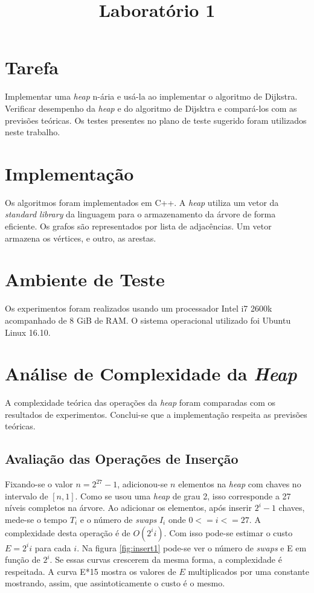 \documentclass{iiufrgs}
\title{Laboratório 1}
\author{}{Thiago Bell}
\begin{document}
\maketitle

\setcounter{chapter}{1}

\section{Tarefa}
Implementar uma \textit{heap} n-ária e usá-la ao implementar o algoritmo de Dijkstra. 
Verificar desempenho da \textit{heap} e do algoritmo de Dijsktra e compará-los com as previs\~oes teóricas.
Os testes presentes no plano de teste sugerido foram utilizados neste trabalho.

\section{Implementaç\~ao}
Os algoritmos foram implementados em C++. A \textit{heap} utiliza um vetor da \textit{standard library} da linguagem para
o armazenamento da árvore de forma eficiente. Os grafos s\~ao representados
por lista de adjacências. Um vetor armazena os vértices, e outro, as arestas.

\section{Ambiente de Teste}
Os experimentos foram realizados usando um processador Intel i7 2600k acompanhado de 8 GiB de RAM. 
O sistema operacional utilizado foi Ubuntu Linux 16.10.

\section{Análise de Complexidade da \textit{Heap}}
A complexidade teórica das operaç\~oes da \textit{heap} foram comparadas com os resultados de experimentos.
Conclui-se que a implementaç\~ao respeita as previs\~oes teóricas.

\subsection{Avaliaç\~ao das Operaç\~oes de Inserç\~ao}
Fixando-se o valor $n = 2^{27}-1$, adicionou-se $n$ elementos na \textit{heap} com chaves no intervalo de $[n,1]$.  
Como se usou uma \textit{heap} de grau 2, isso corresponde a 27 níveis completos na árvore. 
Ao adicionar os elementos, após inserir $2^{i}-1$ chaves, mede-se o tempo $T_i$ e o número de \textit{swaps} 
$I_i$ onde $0<=i<=27$. A complexidade desta operação é de $O(2^i  i)$.
Com isso pode-se estimar o custo $E = 2^i i$ para cada $i$. Na figura \ref{fig:insert1}
pode-se ver o número de \textit{swaps} e E em funç\~ao de $2^i$. Se essas curvas crescerem da mesma forma,
a complexidade é respeitada. A curva E*15 mostra os valores de $E$ multiplicados por
uma constante mostrando, assim, que assintoticamente o custo é o mesmo.
\end{document}
